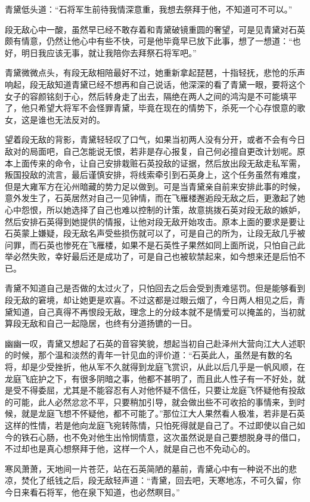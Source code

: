 青黛低头道：“石将军生前待我情深意重，我想去祭拜于他，不知道可不可以。”

段无敌心中一酸，虽然早已经不敢存着和青黛破镜重圆的奢望，可是见青黛对石英颇有情意，仍然让他心中有些不快，可是他毕竟早已放下此事，想了一想道：“也好，明日我应该无事，就让我陪你去拜祭石将军吧。”

青黛微微点头，有段无敌相陪最好不过，她重新拿起琵琶，十指轻抚，悲怆的乐声响起，段无敌知道青黛已经不想再和自己说话，他深深的看了青黛一眼，要将这个女子的容颜铭刻于心，然后转身走了出去，隔绝在两人之间的鸿沟是不可能填平了，他只希望大将军不会怪罪青黛，毕竟在现在的情势下，杀死一个心存恨意的歌女，这是谁也无法反对的。

望着段无敌的背影，青黛轻轻叹了口气，如果当初两人没有分开，或者不会有今日敌对的局面吧，自己怎能说无恨，若非是存心报复，自己何必擅自更改计划呢。原本上面传来的命令，让自己安排栽赃石英投敌的证据，然后放出段无敌走私军需，叛国投敌的流言，最后谨慎安排，将线索牵引到石英身上，这个任务虽然有难度，但是大雍军方在沁州暗藏的势力足以做到。可是当青黛亲自前来安排此事的时候，意外发生了，石英居然对自己一见钟情，而在飞雁楼邂逅段无敌之后，更激起了她心中怨恨，所以她选择了自己也难以控制的计策，故意挑拨石英对段无敌的嫉妒，然后安排石英得到她提供的情报，让他对段无敌开始攻击。原本上面的要求是要让石英蒙上嫌疑，段无敌名声受些损伤就可以了，可是自己的所为，让段无敌几乎被问罪，而石英也惨死在飞雁楼，如果不是石英性子果然如同上面所说，只怕自己此举必然失败，幸好最后还是成功了，可是自己也被软禁起来，如今想来还是后怕不已。

青黛不知道自己是否做的太过火了，只怕回去之后会受到责难惩罚。但是能够看到段无敌的窘境，却让她更是欢喜。不过这都是过眼云烟了，今日两人相见之后，青黛知道，自己真得不再恨段无敌，理念上的分歧本就不是情爱可以掩盖的，当初就算段无敌和自己一起隐居，也终有分道扬镳的一日。

幽幽一叹，青黛又想起了石英的音容笑貌，想起当初自己赴泽州大营向江大人述职的时候，那个温和淡然的青年一针见血的评价道：“石英此人，虽然是有数的名将，却是少受挫折，他从军不久就得到龙庭飞赏识，从此以后几乎是一帆风顺，在龙庭飞庇护之下，有很多阴暗之事，他都不甚明了，而且此人性子有一不好处，就是受不得委屈，尤其是不能容忍有人对他怀疑不信任，只要让龙庭飞怀疑他有投敌的可能，此人必然忿忿不平，只要稍加引导，就会做出些不可收拾的事情来，到时候，就是龙庭飞想不怀疑他，都不可能了。”那位江大人果然看人极准，若非是石英这样的性情，若是他向龙庭飞宛转陈情，只怕死得就是自己了。不过即使以自己如今的铁石心肠，也不免对他生出怜悯情意，这次虽然说是自己要想脱身寻的借口，不过却也是真心想祭拜于他，这样一个人，就是自己也不免动心的。

寒风萧萧，天地间一片苍茫，站在石英简陋的墓前，青黛心中有一种说不出的悲凉，焚化了纸钱之后，段无敌轻声道：“青黛，回去吧，天寒地冻，不可久留，你今日来看石将军，他在泉下知道，也必然瞑目。”

